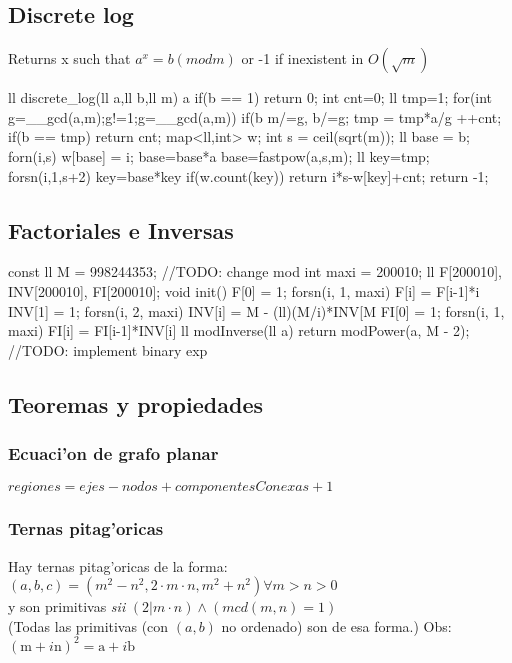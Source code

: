 \documentclass[10pt, landscape, twocolumn, a4paper, notitlepage]{article}
\begin{document}
\subsection{Discrete log}
Returns x such that $a^x = b (mod m)$ or -1 if inexistent in $O(\sqrt{m})$
\begin{code}
ll discrete_log(ll a,ll b,ll m) {
    a%
    if(b == 1) return 0;
    int cnt=0;
    ll tmp=1;
    for(int g=__gcd(a,m);g!=1;g=__gcd(a,m)) {
        if(b%
        m/=g, b/=g;
        tmp = tmp*a/g%
        ++cnt;
        if(b == tmp) return cnt;
    }
    map<ll,int> w;
    int s = ceil(sqrt(m));
    ll base = b;
    forn(i,s) {
        w[base] = i;
        base=base*a%
    }
    base=fastpow(a,s,m);
    ll key=tmp;
    forsn(i,1,s+2) {
        key=base*key%
        if(w.count(key)) return i*s-w[key]+cnt;
    }
    return -1;
}
\end{code}
\subsection{Factoriales e Inversas}
\begin{code}
const ll M = 998244353; //TODO: change mod
int maxi = 200010;
ll F[200010], INV[200010], FI[200010];
void init(){
	F[0] = 1; forsn(i, 1, maxi) F[i] = F[i-1]*i %
	INV[1] = 1; forsn(i, 2, maxi) INV[i] = M - (ll)(M/i)*INV[M%
	FI[0] = 1; forsn(i, 1, maxi) FI[i] = FI[i-1]*INV[i] %
}
ll modInverse(ll a){
    return modPower(a, M - 2); //TODO: implement binary exp
}
\end{code}
\subsection{Teoremas y propiedades}%
\subsubsection{Ecuaci'on de grafo planar}
$regiones = ejes - nodos + componentesConexas + 1$
\subsubsection{Ternas pitag'oricas}
Hay ternas pitag'oricas de la forma: $(a,b,c) = ( m^2-n^2 , 2\cdot m\cdot n, m^2+n^2 ) \forall m > n > 0 $\\
y son primitivas \emph{sii} $(2 | m\cdot n) \land (mcd(m, n) = 1)$\\
(Todas las primitivas (con $(a,b)$ no ordenado) son de esa forma.) Obs: $(\mathrm{m}+i\mathrm{n})^2 = \mathrm{a}+i\mathrm{b}$
\end{document}
